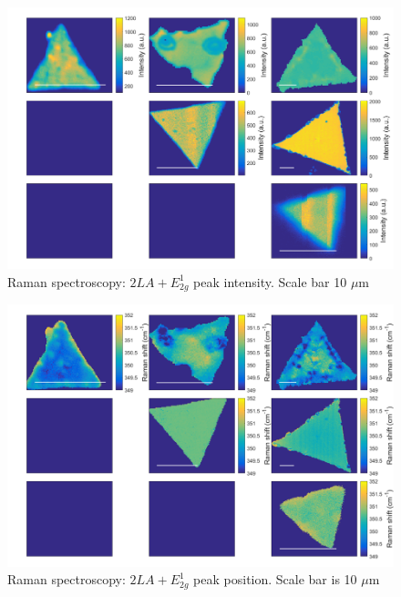 \documentclass[12pt]{article}
\begin{document}
\begin{figure}[h]
\begin{center}
\includegraphics[scale=0.3]{PaperSIMapsIntensityE.png}
\caption{Raman spectroscopy: $2LA+E^1_{2g}$ peak intensity. Scale bar 10 $\mu$m}
\label{fig:PaperSIMapsIntensityE}
\end{center}
\end{figure}

\begin{figure}[h]
\begin{center}
\includegraphics[scale=0.3]{PaperSIMapsPositionE.png}
\caption{Raman spectroscopy: $2LA+E^1_{2g}$ peak position. Scale bar is 10 $\mu$m}
\label{fig:PaperSIMapsPositionE}
\end{center}
\end{figure}
\end{document}
